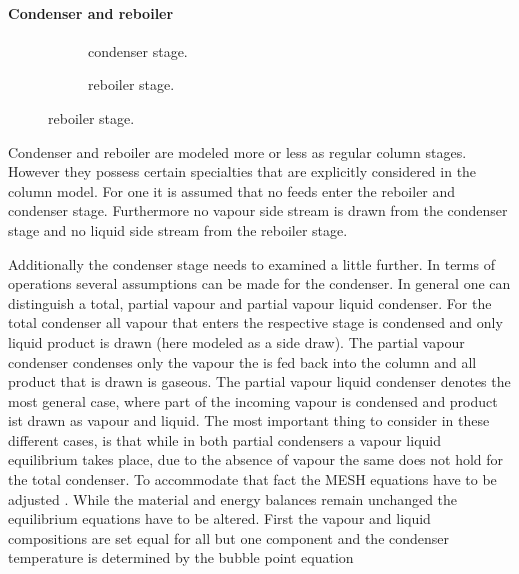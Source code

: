     \paragraph{Condenser and reboiler}
        \begin{figure}
            \centering
            \begin{subfigure}{0.45\textwidth}
                \centering
                
                \caption{condenser stage.}
                \label{fig:col_condenser}
            \end{subfigure}
            \begin{subfigure}{0.45\textwidth}
                \centering
                
                \caption{reboiler stage.}
                \label{fig:col_reboiler}
            \end{subfigure}
        \end{figure}

        Condenser and reboiler are modeled more or less as regular column stages. However they possess
        certain specialties that are explicitly considered in the column model. For one it is assumed
        that no feeds enter the reboiler and condenser stage. Furthermore no vapour side stream is
        drawn from the condenser stage and no liquid side stream from the reboiler stage.

        Additionally the condenser stage needs to examined a little further. In terms of operations
        several assumptions can be made for the condenser. In general one can distinguish a total,
        partial vapour and partial vapour liquid condenser. For the total condenser all vapour that
        enters the respective stage is condensed and only liquid product is drawn (here modeled as
        a side draw). The partial vapour condenser condenses only the vapour the is fed back into
        the column and all product that is drawn is gaseous. The partial vapour liquid condenser
        denotes the most general case, where part of the incoming vapour is condensed and product
        ist drawn as vapour and liquid. The most important thing to consider in these different cases,
        is that while in both partial condensers a vapour liquid equilibrium takes place, due to the
        absence of vapour the same does not hold for the total condenser. To accommodate that fact
        the MESH equations have to be adjusted \cite{Naphtali.1971}. While the material and energy
        balances remain unchanged the equilibrium equations have to be altered. First the vapour and
        liquid compositions are set equal for all but one component
        and the condenser temperature is determined by the bubble point equation

